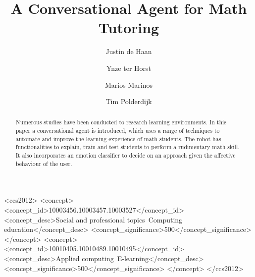 \documentclass[sigconf, nonacm]{acmart}
\begin{document}
\title{A Conversational Agent for Math Tutoring}

\author{Justin de Haan}

\author{Ynze ter Horst}

\author{Marios Marinos}

\author{Tim Polderdijk}

\begin{abstract}
  Numerous studies have been conducted to research learning environments. In this paper a conversational agent is introduced, which uses a range of techniques to automate and improve the learning experience of math students. The robot has functionalities to explain, train and test students to perform a rudimentary math skill. It also incorporates an emotion classifier to decide on an approach given the affective behaviour of the user.
\end{abstract}

\begin{CCSXML}
<ccs2012>
<concept>
<concept_id>10003456.10003457.10003527</concept_id>
<concept_desc>Social and professional topics~Computing education</concept_desc>
<concept_significance>500</concept_significance>
</concept>
<concept>
<concept_id>10010405.10010489.10010495</concept_id>
<concept_desc>Applied computing~E-learning</concept_desc>
<concept_significance>500</concept_significance>
</concept>
</ccs2012>
\end{CCSXML}
\end{document}
